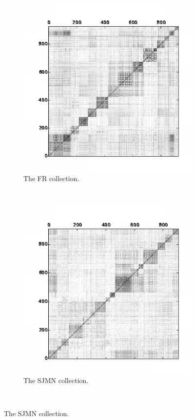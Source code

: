 \documentclass[a4paper]{article}
\begin{document}
\begin{figure}[!htbp]
    \begin{subfigure}[b]{0.3\textwidth}
        \includegraphics[width=\textwidth]{./similarities/FR-simcos}
        \caption{The FR collection.}
        \label{fig:fr_sim}
    \end{subfigure}
    ~ %
    \begin{subfigure}[b]{0.3\textwidth}
        \includegraphics[width=\textwidth]{./similarities/SJMN-simcos}
        \caption{The SJMN collection.}
        \label{fig:sjmn_sim}
    \end{subfigure}\\
        

\end{figure}
\end{document}
